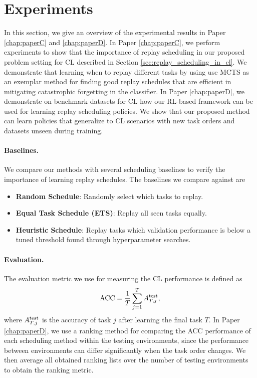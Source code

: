 \section{Experiments}

In this section, we give an overview of the experimental results in Paper \ref{chap:paperC} and \ref{chap:paperD}. In Paper \ref{chap:paperC}, we perform experiments to show that the importance of replay scheduling in our proposed problem setting for CL described in Section \ref{sec:replay_scheduling_in_cl}. We demonstrate that learning when to replay different tasks by using use MCTS as an exemplar method for finding good replay schedules that are efficient in mitigating catastrophic forgetting in the classifier. In Paper \ref{chap:paperD}, we demonstrate on benchmark datasets for CL how our RL-based framework can be used for learning replay scheduling policies. We show that our proposed method can learn policies that generalize to CL scenarios with new task orders and datasets unseen during training.  

\vspace{-3mm}
\paragraph{Baselines.} We compare our methods with several scheduling baselines to verify the importance of learning replay schedules. The baselines we compare against are
\begin{itemize}[itemsep=0em,topsep=1pt]
	\item {\bf Random Schedule}: Randomly select which tasks to replay.
	\item {\bf Equal Task Schedule (ETS)}: Replay all seen tasks equally.
	\item {\bf Heuristic Schedule}: Replay tasks which validation performance is below a tuned threshold found through hyperparameter searches.
\end{itemize} 

\vspace{-3mm}
\paragraph{Evaluation.} The evaluation metric we use for measuring the CL performance is defined as
\begin{align}
	{\text{ACC}} = \frac{1}{T} \sum_{j=1}^{T} A_{T, j}^{{\text{test}}},
\end{align}
where $A_{T, j}^{{\text{test}}}$ is the accuracy of task $j$ after learning the final task $T$.  In Paper \ref{chap:paperD}, we use a ranking method for comparing the ACC performance of each scheduling method within the testing environments, since the performance between environments can differ significantly when the task order changes. We then average all obtained ranking lists over the number of testing environments to obtain the ranking metric. 


